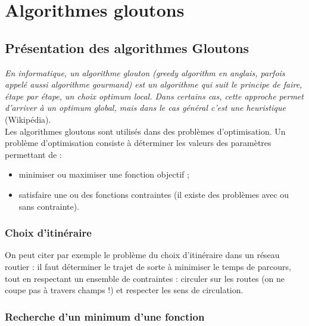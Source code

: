 \setchapterpreamble[u]{\margintoc}
\chapter{Algorithmes gloutons}




\section{Présentation des algorithmes Gloutons}

\textit{
En informatique, un algorithme glouton (greedy algorithm en anglais, parfois appelé aussi algorithme gourmand) est un algorithme qui suit le principe de faire, étape par étape, un choix optimum local. Dans certains cas, cette approche permet d'arriver à un optimum global, mais dans le cas général c'est une heuristique } (Wikipédia).\\

Les algorithmes gloutons sont utilisés dans des problèmes d’optimisation. Un problème d’optimisation consiste à déterminer les valeurs des paramètres permettant de :
\begin{itemize}
	\item minimiser ou maximiser une fonction objectif ;
	\item satisfaire une ou des fonctions contraintes (il existe des problèmes avec ou sans contrainte).
\end{itemize}

\subsection{Choix d'itinéraire}
 
On peut citer par exemple le problème du choix d’itinéraire dans un réseau routier : il faut déterminer le trajet de sorte à minimiser le temps de parcours, tout en respectant un ensemble de contraintes : circuler sur les routes (on ne coupe pas à travers champs !) et respecter les sens de circulation.

\subsection{Recherche d'un minimum d'une fonction} 

